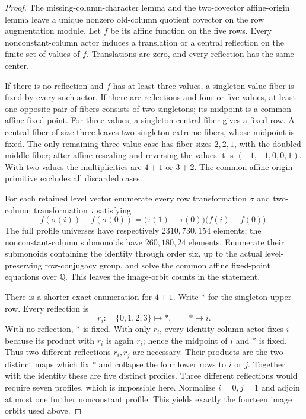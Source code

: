 \begin{proof}
The missing-column-character lemma and the two-covector affine-origin
lemma leave a unique nonzero old-column quotient covector on the row
augmentation module. Let $f$ be its affine function on the five rows.
Every nonconstant-column actor induces a translation or a central
reflection on the finite set of values of $f$. Translations are zero,
and every reflection has the same center.

If there is no reflection and $f$ has at least three values, a
singleton value fiber is fixed by every such actor. If there are
reflections and four or five values, at least one opposite pair of
fibers consists of two singletons; its midpoint is a common affine
fixed point. For three values, a singleton central fiber gives a
fixed row. A central fiber of size three leaves two singleton extreme
fibers, whose midpoint is fixed. The only remaining three-value
case has fiber sizes $2,2,1$, with the doubled middle fiber; after
affine rescaling and reversing the values it is
$(-1,-1,0,0,1)$. With two values the multiplicities are $4+1$ or
$3+2$. The common-affine-origin primitive excludes all discarded
cases.

For each retained level vector enumerate every row transformation
$\sigma$ and two-column transformation $\tau$ satisfying
\[
 f(\sigma(i))-f(\sigma(0))
 =\bigl(\tau(1)-\tau(0)\bigr)\bigl(f(i)-f(0)\bigr).
\]
The full profile universes have respectively $2310,730,154$ elements;
the nonconstant-column submonoids have $260,180,24$ elements.
Enumerate their submonoids containing the identity through order six,
up to the actual level-preserving row-conjugacy group, and solve the
common affine fixed-point equations over $\mathbb Q$.
This leaves the image-orbit counts in the statement.

There is a shorter exact enumeration for $4+1$. Write $*$ for the
singleton upper row. Every reflection is
\[
 r_i:\quad\{0,1,2,3\}\longmapsto *,\qquad *\longmapsto i.
\]
With no reflection, $*$ is fixed. With only $r_i$, every
identity-column actor fixes $i$ because its product with $r_i$ is
again $r_i$; hence the midpoint of $i$ and $*$ is fixed. Thus two
different reflections $r_i,r_j$ are necessary. Their products are
the two distinct maps which fix $*$ and collapse the four lower
rows to $i$ or $j$. Together with the identity these are five
distinct profiles. Three different reflections would require seven
profiles, which is impossible here. Normalize $i=0,j=1$ and adjoin
at most one further nonconstant profile. This yields exactly the
fourteen image orbits used above.


\end{proof}
